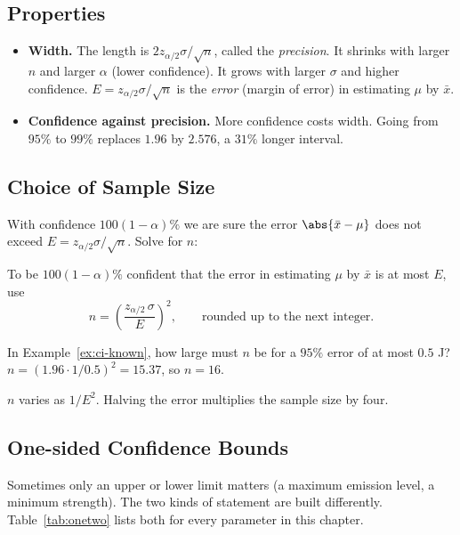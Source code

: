 \subsection*{Properties}

\begin{itemize}
  \item \textbf{Width.} The length is $2z_{\alpha/2}\sigma/\sqrt n$, called the \emph{precision}. It shrinks with larger $n$ and larger $\alpha$ (lower confidence). It grows with larger $\sigma$ and higher confidence. $E=z_{\alpha/2}\sigma/\sqrt n$ is the \emph{error} (margin of error) in estimating $\mu$ by $\bar{x}$.
  \item \textbf{Confidence against precision.} More confidence costs width. Going from $95\%$ to $99\%$ replaces $1.96$ by $2.576$, a $31\%$ longer interval.
\end{itemize}

\subsection{Choice of Sample Size}

With confidence $100(1-\alpha)\%$ we are sure the error $\abs{\bar{x}-\mu}$ does not exceed $E=z_{\alpha/2}\sigma/\sqrt n$. Solve for $n$:

\begin{theorem}\label{thm:samplesize-mean}
To be $100(1-\alpha)\%$ confident that the error in estimating $\mu$ by $\bar{x}$ is at most $E$, use
\[ n=\left(\frac{z_{\alpha/2}\,\sigma}{E}\right)^2,\qquad\text{rounded up to the next integer.} \]
\end{theorem}

\begin{example}
In Example~\ref{ex:ci-known}, how large must $n$ be for a $95\%$ error of at most $0.5$ J? $n=(1.96\cdot1/0.5)^2=15.37$, so $n=16$.
\end{example}

$n$ varies as $1/E^2$. Halving the error multiplies the sample size by four.

\subsection{One-sided Confidence Bounds}

Sometimes only an upper or lower limit matters (a maximum emission level, a minimum strength). The two kinds of statement are built differently. Table~\ref{tab:onetwo} lists both for every parameter in this chapter.

